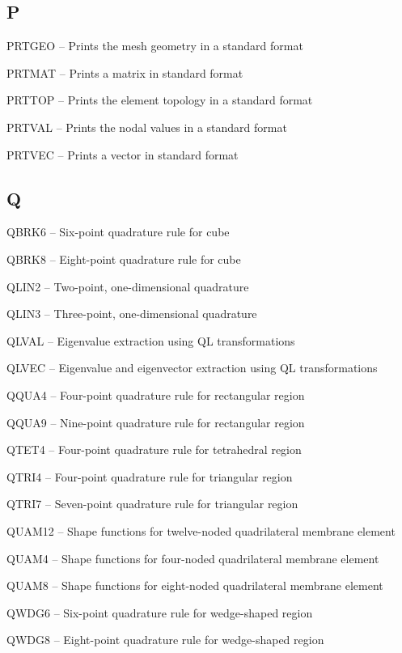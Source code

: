\subsection*{P} %
\begin{list}{}{\leftmargin=80pt  \itemsep=0pt}
\item[PRTGEO \hfill] -- Prints the mesh geometry in a standard format
\item[PRTMAT \hfill] -- Prints a matrix in standard format
\item[PRTTOP \hfill] -- Prints the element topology in a standard format
\item[PRTVAL \hfill] -- Prints the nodal values in a standard format
\item[PRTVEC \hfill] -- Prints a vector in standard format
\end{list}
\subsection*{Q} %
\begin{list}{}{\leftmargin=80pt  \itemsep=0pt}
\item[QBRK6 \hfill]  -- Six-point quadrature rule for cube
\item[QBRK8 \hfill]  -- Eight-point quadrature rule for cube
\item[QLIN2 \hfill]  -- Two-point, one-dimensional quadrature
\item[QLIN3 \hfill]  -- Three-point, one-dimensional quadrature
\item[QLVAL \hfill]  -- Eigenvalue extraction using QL transformations
\item[QLVEC \hfill]  -- Eigenvalue and eigenvector extraction using QL transformations
\item[QQUA4 \hfill]  -- Four-point quadrature rule for rectangular region
\item[QQUA9 \hfill]  -- Nine-point quadrature rule for rectangular region
\item[QTET4 \hfill]  -- Four-point quadrature rule for tetrahedral region
\item[QTRI4 \hfill]  -- Four-point quadrature rule for triangular region
\item[QTRI7 \hfill]  -- Seven-point quadrature rule for triangular region
\item[QUAM12 \hfill] -- Shape functions for twelve-noded quadrilateral membrane element
\item[QUAM4 \hfill]  -- Shape functions for four-noded quadrilateral membrane element
\item[QUAM8 \hfill]  -- Shape functions for eight-noded quadrilateral membrane element
\item[QWDG6 \hfill]  -- Six-point quadrature rule for wedge-shaped region
\item[QWDG8 \hfill]  -- Eight-point quadrature rule for wedge-shaped region
\end{list}
